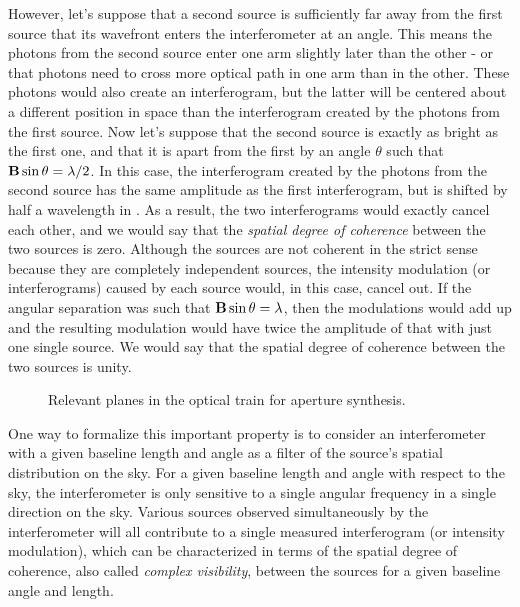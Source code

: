 However, let's suppose that a second source is sufficiently far away from the first source that its wavefront enters the interferometer at an angle. This means the photons from the second source enter one arm slightly later than the other - or that photons need to cross more optical path in one arm than in the other. These photons would also create an interferogram, but the latter will be centered about a different position in \OPD  space than the interferogram created by the photons from the first source. Now let's suppose that the second source is exactly as bright as the first one, and that it is apart from the first by an angle $\theta$ such that $\mathbf{B}\sin\theta = \lambda/2$. In this case,  the interferogram created by the photons from the second source has the same amplitude as the first interferogram, but is shifted by half a wavelength in \OPD. As a result, the two interferograms would exactly cancel each other, and we would say that the \textit{spatial degree of coherence} between the two sources is zero. Although the sources are not coherent in the strict sense because they are completely independent sources, the intensity modulation (or interferograms) caused by each source would, in this case, cancel out. If the angular separation was such that $\mathbf{B}\sin\theta = \lambda$, then the modulations would add up and the resulting modulation would have twice the amplitude of that with just one single source. We would say that the spatial degree of coherence between the two sources is unity. 

\begin{figure}[!h]
	\centering
	
	\caption[Aperture synthesis]{Relevant planes in the optical train for aperture synthesis.}
	\label{fig:aperturesynthesis}
    \end{figure}



One way to formalize this important property is to consider an interferometer with a given baseline length and angle as a filter of the source's spatial distribution on the sky. For a given baseline length and angle with respect to the sky, the interferometer is only sensitive to a single angular frequency in a single direction on the sky. Various sources observed simultaneously by the interferometer will all contribute to a single measured interferogram (or intensity modulation), which can be characterized in terms of the spatial degree of coherence, also called \textit{complex visibility}, between the sources for a given baseline angle and length. 

